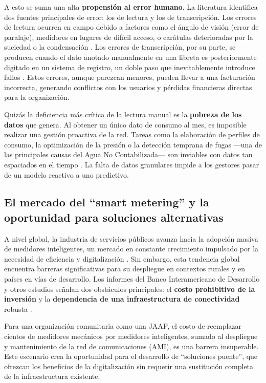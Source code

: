 A esto se suma una alta \textbf{propensión al error humano}. La literatura identifica dos fuentes principales de error: los de lectura y los de transcripción. Los errores de lectura ocurren en campo debido a factores como el ángulo de visión (error de paralaje), medidores en lugares de difícil acceso, o carátulas deterioradas por la suciedad o la condensación \parencite{Laroca2021Towards}. Los errores de transcripción, por su parte, se producen cuando el dato anotado manualmente en una libreta es posteriormente digitado en un sistema de registro, un doble paso que inevitablemente introduce fallos \parencite{Khan2024LowCost, Chaki2019Automation}. Estos errores, aunque parezcan menores, pueden llevar a una facturación incorrecta, generando conflictos con los usuarios y pérdidas financieras directas para la organización.

Quizás la deficiencia más crítica de la lectura manual es la \textbf{pobreza de los datos} que genera. Al obtener un único dato de consumo al mes, es imposible realizar una gestión proactiva de la red. Tareas como la elaboración de perfiles de consumo, la optimización de la presión o la detección temprana de fugas —una de las principales causas del Agua No Contabilizada— son inviables con datos tan espaciados en el tiempo \parencite{Kainz2021Measurement}. La falta de datos granulares impide a los gestores pasar de un modelo reactivo a uno predictivo.

\subsection{El mercado del ``smart metering'' y la oportunidad para soluciones alternativas}
\label{ssec:smart_metering_market}

A nivel global, la industria de servicios públicos avanza hacia la adopción masiva de medidores inteligentes, un mercado en constante crecimiento impulsado por la necesidad de eficiencia y digitalización \parencite{GlobalGrowth2023}. Sin embargo, esta tendencia global encuentra barreras significativas para su despliegue en contextos rurales y en países en vías de desarrollo. Los informes del Banco Interamericano de Desarrollo y otros estudios señalan dos obstáculos principales: el \textbf{costo prohibitivo de la inversión} y la \textbf{dependencia de una infraestructura de conectividad} robusta \parencite{IADB2022, Fieldeke2021}.

Para una organización comunitaria como una JAAP, el costo de reemplazar cientos de medidores mecánicos por medidores inteligentes, sumado al despliegue y mantenimiento de la red de comunicaciones (AMI), es una barrera insuperable. Este escenario crea la oportunidad para el desarrollo de ``soluciones puente'', que ofrezcan los beneficios de la digitalización sin requerir una sustitución completa de la infraestructura existente.

